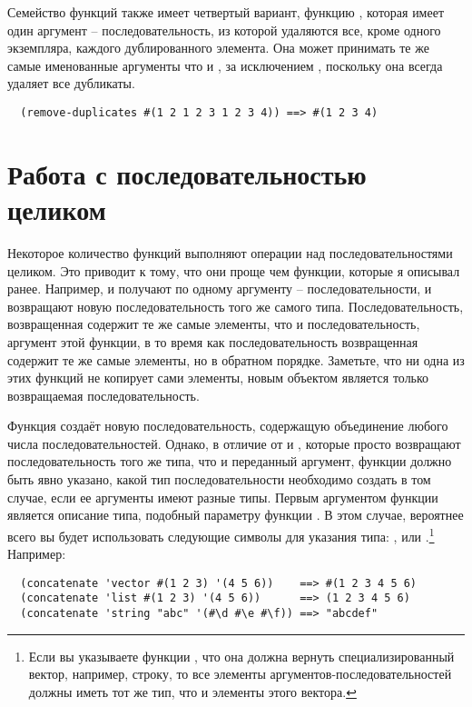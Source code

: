 Семейство функций  также имеет четвертый вариант, функцию
, которая имеет один аргумент -- последовательность, из которой
удаляются все, кроме одного экземпляра, каждого дублированного элемента.  Она может
принимать те же самые именованные аргументы что и , за исключением
, поскольку она всегда удаляет все дубликаты.

\begin{verbatim}
  (remove-duplicates #(1 2 1 2 3 1 2 3 4)) ==> #(1 2 3 4)
\end{verbatim}

\section{Работа с последовательностью целиком}

Некоторое количество функций выполняют операции над последовательностями целиком.  Это
приводит к тому, что они проще чем функции, которые я описывал ранее.  Например,
 и  получают по одному аргументу -- последовательности, и
возвращают новую последовательность того же самого типа.  Последовательность, возвращенная
 содержит те же самые элементы, что и последовательность, аргумент этой
функции, в то время как последовательность возвращенная  содержит те же
самые элементы, но в обратном порядке.  Заметьте, что ни одна из этих функций не копирует
сами элементы, новым объектом является только возвращаемая последовательность.

Функция  создаёт новую последовательность, содержащую объединение любого
числа последовательностей.  Однако, в отличие от  и , которые
просто возвращают последовательность того же типа, что и переданный аргумент, функции
 должно быть явно указано, какой тип последовательности необходимо
создать в том случае, если ее аргументы имеют разные типы.  Первым аргументом функции
является описание типа, подобный параметру  функции .
В этом случае, вероятнее всего вы будет использовать следующие символы для указания типа:
,  или .\footnote{Если вы указываете функции
  , что она должна вернуть специализированный вектор, например, строку,
  то все элементы аргументов-последовательностей должны иметь тот же тип, что и элементы
  этого вектора.}  Например:

\begin{verbatim}
  (concatenate 'vector #(1 2 3) '(4 5 6))    ==> #(1 2 3 4 5 6)
  (concatenate 'list #(1 2 3) '(4 5 6))      ==> (1 2 3 4 5 6)
  (concatenate 'string "abc" '(#\d #\e #\f)) ==> "abcdef"
\end{verbatim}

